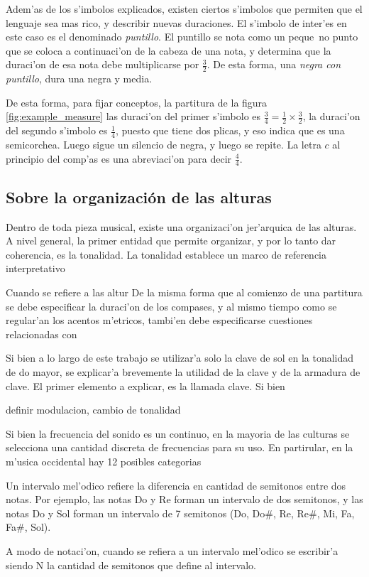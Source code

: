Adem'as de los s'imbolos explicados, existen ciertos s'imbolos que permiten que el lenguaje sea mas rico, y describir nuevas duraciones. El s'imbolo de inter'es
en este caso es el denominado \emph{puntillo}. El puntillo se nota como un peque~no punto que se coloca a continuaci'on de la cabeza de una nota, 
y determina que la duraci'on de esa nota debe multiplicarse por $\frac{3}{2}$. De esta forma, una \emph{negra con puntillo}, dura una negra y media. 

De esta forma, para fijar conceptos, la partitura de la figura \ref{fig:example_measure} las duraci'on del primer s'imbolo es $\frac{3}{4}=\frac{1}{2}\times\frac{3}{2}$,
la duraci'on del segundo s'imbolo es $\frac{1}{4}$, puesto que tiene dos plicas, y eso indica que es una semicorchea. Luego sigue un silencio de negra, y luego se 
repite. La letra $c$ al principio del comp'as es una abreviaci'on para decir $\frac{4}{4}$.

\begin{imagen}
\end{imagen}

\subsection{Sobre la organizaci\'on de las alturas}
Dentro de toda pieza musical, existe una organizaci'on jer'arquica de las alturas. A nivel general, la primer entidad que permite organizar, y por lo tanto dar 
coherencia, es la tonalidad. La tonalidad establece un marco de referencia interpretativo  

Cuando se refiere a las altur
De la misma forma que al comienzo de una partitura se debe especificar la duraci'on de los compases, y al mismo tiempo como se regular'an los acentos m'etricos,
tambi'en debe especificarse cuestiones relacionadas con 

Si bien a lo largo de este trabajo se utilizar'a solo la clave de sol en la tonalidad de do mayor, se explicar'a brevemente la utilidad de la clave y de la armadura
de clave.
El primer elemento a explicar, es la llamada clave. Si bien 

definir modulacion, cambio de tonalidad 


Si bien la frecuencia del sonido es un continuo, en la mayoria de las culturas se selecciona una cantidad discreta de frecuencias para su uso. 
En partirular, en la m'usica occidental hay 12 posibles categorias

Un intervalo mel'odico refiere la diferencia en cantidad de semitonos entre dos notas. Por ejemplo, las notas Do y Re forman un intervalo de dos semitonos, y las notas 
Do y Sol forman un intervalo de 7 semitonos (Do, Do\#, Re, Re\#, Mi, Fa, Fa\#, Sol). 

A modo de notaci'on, cuando se refiera a un intervalo mel'odico se escribir'a  siendo N la cantidad de semitonos que define al intervalo. 
